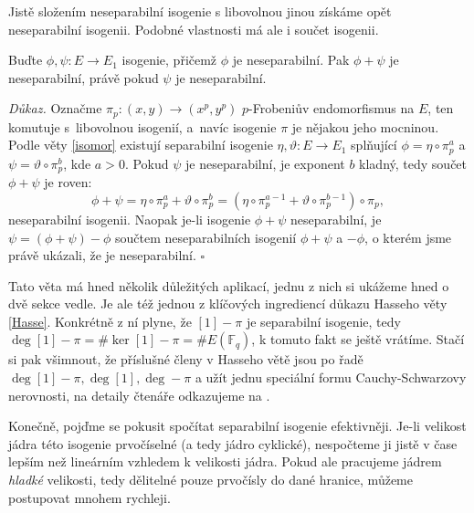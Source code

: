 \documentclass[12pt]{report}
\begin{document}
Jistě složením neseparabilní isogenie s libovolnou jinou získáme opět neseparabilní isogenii. Podobné vlastnosti má ale i součet isogenii.
\begin{veta}\label{separsum}
Buďte $\phi,\psi : E \longrightarrow E_1$ isogenie, přičemž $\phi$ je neseparabilní. Pak $\phi+\psi$ je neseparabilní, právě pokud $\psi$ je neseparabilní.
\end{veta}
\noindent \textit{Důkaz.} Označme $\pi_p : (x,y) \rightarrow (x^p,y^p)$ $p$-Frobeniův endomorfismus na $E$, ten komutuje s~libovolnou isogenií, a~navíc isogenie $\pi$ je nějakou jeho mocninou. Podle věty \ref{isomor} existují separabilní isogenie $\eta,\vartheta : E \longrightarrow E_1$ splňující $\phi =  \eta \circ \pi_p ^a$ a $\psi = \vartheta\circ \pi_p ^b$, kde $a > 0$. Pokud $\psi$ je neseparabilní, je exponent $b$ kladný, tedy součet $\phi+\psi$ je roven:
\begin{equation*}
\phi+\psi = \eta \circ \pi_p ^a +\vartheta\circ \pi_p ^b = (\eta \circ \pi_p ^{a-1} + \vartheta \circ \pi_p ^{b-1}) \circ \pi_p, 
\end{equation*}
neseparabilní isogenii. Naopak je-li isogenie $\phi+\psi$ neseparabilní, je $\psi = (\phi+\psi) - \phi$ součtem neseparabilních isogenií $\phi+\psi$ a $-\phi$, o kterém jsme právě ukázali, že je neseparabilní. \hfill $\square$\\

\begin{poznamka}
Tato věta má hned několik důležitých aplikací, jednu z nich si ukážeme hned o dvě sekce vedle. Je ale též jednou z klíčových ingrediencí důkazu Hasseho věty \ref{Hasse}. Konkrétně z ní plyne, že $[1]-\pi$ je separabilní isogenie, tedy $\deg [1]-\pi = \# \ker [1]-\pi = \# E(\mathbb{F}_q)$, k tomuto fakt se ještě vrátíme. Stačí si pak všimnout, že příslušné členy v Hasseho větě jsou po řadě $\deg [1] - \pi, \deg [1], \deg -\pi$ a užít jednu speciální formu Cauchy-Schwarzovy nerovnosti, na detaily čtenáře odkazujeme na \cite[Thm. V.1.1.]{Silverman}.
\end{poznamka}

Konečně, pojďme se pokusit spočítat separabilní isogenie efektivněji. Je-li velikost jádra této isogenie prvočíselné (a tedy jádro cyklické), nespočteme ji jistě v čase lepším než lineárním vzhledem k velikosti jádra. Pokud ale pracujeme jádrem \textit{hladké} velikosti, tedy dělitelné pouze prvočísly do dané hranice, můžeme postupovat mnohem rychleji. 
\end{document}
